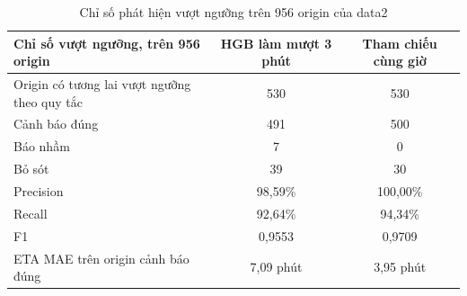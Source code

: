\begin{table}[htbp]
        \centering
        \caption{Chỉ số phát hiện vượt ngưỡng trên 956 origin của data2}
        \label{tab:threshold_metrics}
        \begin{tabular}{|l|c|c|}
            \hline
            \textbf{Chỉ số vượt ngưỡng, trên 956 origin} & \textbf{HGB làm mượt 3 phút} & \textbf{Tham chiếu cùng giờ} \\
            \hline
            Origin có tương lai vượt ngưỡng theo quy tắc & 530 & 530 \\
            Cảnh báo đúng & 491 & 500 \\
            Báo nhầm & 7 & 0 \\
            Bỏ sót & 39 & 30 \\
            Precision & 98,59\% & 100,00\% \\
            Recall & 92,64\% & 94,34\% \\
            F1 & 0,9553 & 0,9709 \\
            ETA MAE trên origin cảnh báo đúng & 7,09 phút & 3,95 phút \\
            \hline
        \end{tabular}
    \end{table}